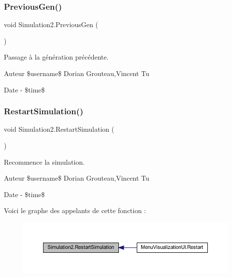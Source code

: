 \subsubsection{\texorpdfstring{Previous\+Gen()}{PreviousGen()}}
{\footnotesize\ttfamily void Simulation2.\+Previous\+Gen (\begin{DoxyParamCaption}{ }\end{DoxyParamCaption})\hspace{0.3cm}{\ttfamily [inline]}}



Passage à la génération précédente. 

\begin{DoxyAuthor}{Auteur}
\$username\$ Dorian Grouteau,Vincent Tu 
\end{DoxyAuthor}
\begin{DoxyDate}{Date}
-\/ \$time\$ 
\end{DoxyDate}
\mbox{\label{class_simulation2_a151637139908a2546fcf9dd5203aa247}} 
\subsubsection{\texorpdfstring{Restart\+Simulation()}{RestartSimulation()}}
{\footnotesize\ttfamily void Simulation2.\+Restart\+Simulation (\begin{DoxyParamCaption}{ }\end{DoxyParamCaption})\hspace{0.3cm}{\ttfamily [inline]}}



Recommence la simulation. 

\begin{DoxyAuthor}{Auteur}
\$username\$ Dorian Grouteau,Vincent Tu 
\end{DoxyAuthor}
\begin{DoxyDate}{Date}
-\/ \$time\$ 
\end{DoxyDate}
Voici le graphe des appelants de cette fonction \+:
\nopagebreak
\begin{figure}[H]
\begin{center}
\leavevmode
\includegraphics[width=350pt]{class_simulation2_a151637139908a2546fcf9dd5203aa247_icgraph}
\end{center}
\end{figure}
\mbox{\label{class_simulation2_a68881bc6b234067ccb956b04d1f59e90}} 
